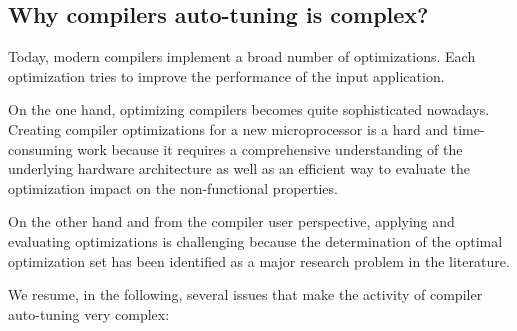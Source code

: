  
 
 

\subsection{Why compilers auto-tuning is complex?}
\label{sec:Why compilers auto-tuning is complex?}
Today, modern compilers implement a broad number of optimizations. Each optimization tries to improve the performance of the input application.

On the one hand, optimizing compilers becomes quite sophisticated nowadays. Creating compiler optimizations for a new microprocessor is a hard and time-consuming work because it requires a comprehensive understanding of the underlying hardware architecture as well as an efficient way to evaluate the optimization impact on the non-functional properties. 

On the other hand and from the compiler user perspective, applying and evaluating optimizations is challenging because the determination of the optimal optimization set has been identified as a major research problem in the literature\cite{knijnenburg2002iterative}.

We resume, in the following, several issues that make the activity of compiler auto-tuning very complex:

